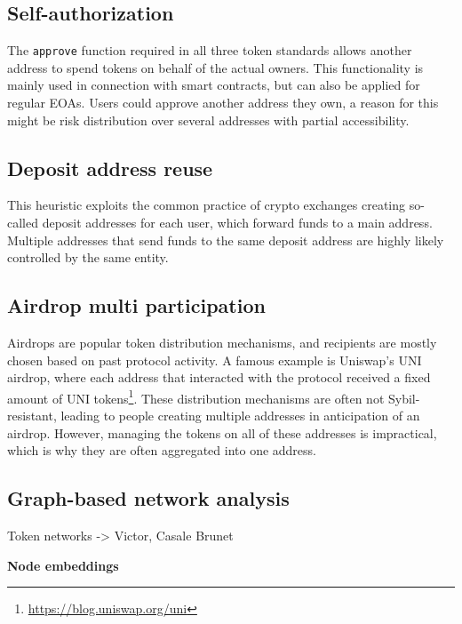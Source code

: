 \documentclass[12pt,a4paper,titlepage,oneside,english]{article}
\begin{document}

\subsection{Self-authorization}
The \texttt{approve} function required in all three token standards allows another address to spend tokens on behalf of the actual owners. This functionality is mainly used in connection with smart contracts, but can also be applied for regular EOAs. Users could approve another address they own, a reason for this might be risk distribution over several addresses with partial accessibility. \citep{FV:17}

\subsection{Deposit address reuse}
This heuristic exploits the common practice of crypto exchanges creating so-called deposit addresses for each user, which forward funds to a main address. Multiple addresses that send funds to the same deposit address are highly likely controlled by the same entity. \citep{FV:17}

\subsection{Airdrop multi participation}
Airdrops are popular token distribution mechanisms, and recipients are mostly chosen based on past protocol activity. A famous example is Uniswap's UNI airdrop, where each address that interacted with the protocol received a fixed amount of UNI tokens\footnote{\url{https://blog.uniswap.org/uni}}. These distribution mechanisms are often not Sybil-resistant, leading to people creating multiple addresses in anticipation of an airdrop. However, managing the tokens on all of these addresses is impractical, which is why they are often aggregated into one address. \citep{FV:17}

\subsection{Graph-based network analysis}
Token networks -> Victor, Casale Brunet

\textbf{Node embeddings}
\end{document}
